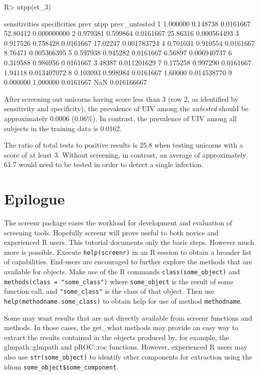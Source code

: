 \documentclass[11pt]{report}
\renewenvironment{Schunk}{\vspace{\topsep}}{\vspace{\topsep}}
\begin{document}
\begin{Schunk}
\begin{Sinput}
R> ntpp(et_3)
\end{Sinput}
\begin{Soutput}
  sensitivities specificities      prev     ntpp prev_untested
1      1.000000      0.148738 0.0161667 52.80412   0.000000000
2      0.979381      0.599864 0.0161667 25.86316   0.000564493
3      0.917526      0.758428 0.0161667 17.02247   0.001783724
4      0.701031      0.910554 0.0161667  8.76471   0.005366395
5      0.597938      0.945282 0.0161667  6.56897   0.006940737
6      0.319588      0.986956 0.0161667  3.48387   0.011201629
7      0.175258      0.997290 0.0161667  1.94118   0.013407072
8      0.103093      0.998984 0.0161667  1.60000   0.014538770
9      0.000000      1.000000 0.0161667      NaN   0.016166667
\end{Soutput}
\end{Schunk}

After screening out unicorns having score less than 3 (row 2, as
identified by sensitivity and specificity), the prevalence of UIV
among the \emph{untested} should be approximately 0.0006 (0.06\%). In
contrast, the prevalence of UIV among all subjects in the training
data is 0.0162.

The ratio of total tests to positive results is 25.8 when testing
unicorns with a score of at least 3. Without screening, in contrast,
an average of approximately
61.7 would need to be tested in order to
detect a single infection.


\section*{Epilogue}

The \textsf{screenr} package eases the workload for development and
evaluation of screening tools. Hopefully \textsf{screenr} will prove useful
to both novice and experienced \textsf{R} users. This tutorial documents only
the basic steps. However much more is possible. Execute
\verb|help(screenr)| in an \textsf{R} session to obtain a broader list of
capabilities. End-users are encouraged to further explore the methods
that are available for objects. Make use of the \textsf{R} commands
\verb|class(some_object)| and \verb|methods(class = "some_class")| where
\verb|some_object| is the result of some function call, and \verb|"some_class"|
is the class of that object. Then use \verb|help(methodname.some_class)| to
obtain help for use of method \verb|methodname|.

Some may want results that are not directly available from \textsf{screenr}
functions and methods. In those cases, the \textsf{get\_what} methods may
provide an easy way to extract the results contained in the objects
produced by, for example, the \textsf{glmpath::glmpath} and \textsf{pROC::roc}
functions. However, experienced R users may also use
\verb|str(some_object)| to identify other components for extraction using
the idiom \verb|some_object$some_component|.



\end{document}
